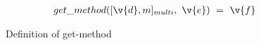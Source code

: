 \begin{figure*}
$$
\begin{array}{lclr}

  \getmethod {\multi {\v{d}} {m}}
             {\v{e}}
             {\v{f}}
             \\
\end{array}
$$
\caption{Definition of get-method}
\end{figure*}
